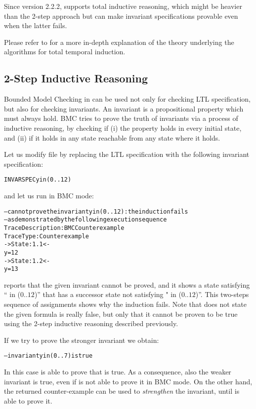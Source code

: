 Since version 2.2.2, \nusmv supports total inductive reasoning,
which might be heavier than the 2-step approach but can
make invariant specifications provable even when the latter fails. 

Please refer to \cite{een04temporal} for a more in-depth explanation
of the theory underlying the algorithms for total temporal induction.


\subsection{2-Step Inductive Reasoning}

Bounded Model Checking in \nusmv can be used not only for checking LTL
specification, but also for checking invariants. An invariant is a
propositional property which must always hold.  BMC tries to prove the
truth of invariants via a process of inductive reasoning, by checking
if (i) the property holds in every initial state, and (ii) if it holds
in any state reachable from any state where it holds.

Let us modify file  by replacing the LTL specification
with the following invariant specification:
\begin{alltt}
INVARSPEC y in (0..12)
\end{alltt}
and let us run \nusmv in BMC mode:
\begin{alltt}
\shellprompt {}
-- cannot prove the invariant y in (0 .. 12) : the induction fails
-- as demonstrated by the following execution sequence
Trace Description: BMC Counterexample
Trace Type: Counterexample
-> State: 1.1 <-
  y = 12
-> State: 1.2 <-
  y = 13
\shellprompt
\end{alltt}

\nusmv reports that the given invariant cannot be proved, and it shows a
state satisfying `` in ($0..12$)'' that has a successor state
not satisfying " in ($0..12$)''. This two-steps sequence of
assignments shows why the induction fails. Note that \nusmv does not
state the given formula is really false, but only that it cannot be
proven to be true using the 2-step inductive reasoning described
previously.

If we try to prove the stronger invariant  we obtain:
\begin{alltt}
\shellprompt {}
-- invariant y in (0 .. 7)   is true
\shellprompt
\end{alltt}
In this case \nusmv is able to prove that  is
true. 
As a consequence, also the weaker invariant  is true, even if
\nusmv is not able to prove it in BMC mode. 
On the other hand, the returned counter-example can be used
to \emph{strengthen} the invariant, until \nusmv is able to prove it.

